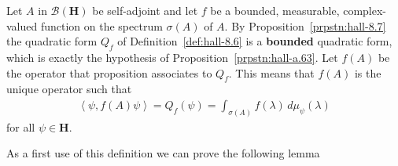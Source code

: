 \begin{definition}
    \label{def:hall-8.8}
    \leanok
    Let $A$ in $\mathcal{B}(\mathbf{H})$ be self-adjoint and let $f$ be a bounded, measurable, complex-valued function on the spectrum $\sigma(A)$ of $A$. By Proposition~\ref{prpstn:hall-8.7} the quadratic form $Q_f$ of Definition~\ref{def:hall-8.6} is a \textbf{bounded} quadratic form, which is exactly the hypothesis of Proposition~\ref{prpstn:hall-a.63}. Let $f(A)$ be the operator that proposition associates to $Q_f$. This means that $f(A)$ is the unique operator such that
    \begin{align}
        \left< \psi, f(A)\psi \right> = Q_f(\psi) = \int_{\sigma(A)} f(\lambda) \, d\mu_\psi(\lambda)
    \end{align}
    for all $\psi \in \mathbf{H}$.
\end{definition}

As a first use of this definition we can prove the following lemma


